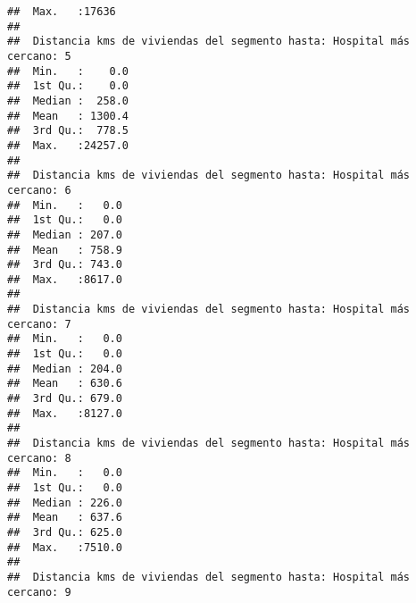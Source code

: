 \documentclass[11pt,]{article}
\begin{document}
\begin{verbatim}
##  Max.   :17636                                                         
##                                                                        
##  Distancia kms de viviendas del segmento hasta: Hospital más cercano: 5
##  Min.   :    0.0                                                       
##  1st Qu.:    0.0                                                       
##  Median :  258.0                                                       
##  Mean   : 1300.4                                                       
##  3rd Qu.:  778.5                                                       
##  Max.   :24257.0                                                       
##                                                                        
##  Distancia kms de viviendas del segmento hasta: Hospital más cercano: 6
##  Min.   :   0.0                                                        
##  1st Qu.:   0.0                                                        
##  Median : 207.0                                                        
##  Mean   : 758.9                                                        
##  3rd Qu.: 743.0                                                        
##  Max.   :8617.0                                                        
##                                                                        
##  Distancia kms de viviendas del segmento hasta: Hospital más cercano: 7
##  Min.   :   0.0                                                        
##  1st Qu.:   0.0                                                        
##  Median : 204.0                                                        
##  Mean   : 630.6                                                        
##  3rd Qu.: 679.0                                                        
##  Max.   :8127.0                                                        
##                                                                        
##  Distancia kms de viviendas del segmento hasta: Hospital más cercano: 8
##  Min.   :   0.0                                                        
##  1st Qu.:   0.0                                                        
##  Median : 226.0                                                        
##  Mean   : 637.6                                                        
##  3rd Qu.: 625.0                                                        
##  Max.   :7510.0                                                        
##                                                                        
##  Distancia kms de viviendas del segmento hasta: Hospital más cercano: 9

\end{verbatim}
\end{document}
